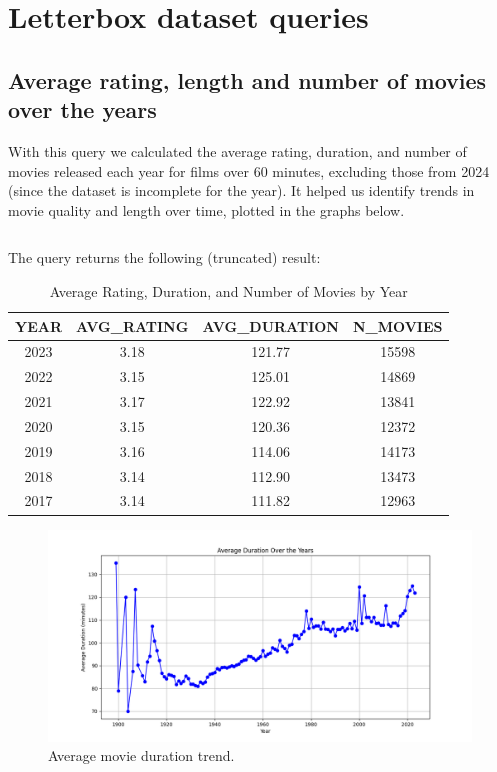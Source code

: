 \documentclass{Configuration_Files/PoliMi3i_thesis}
\begin{document}
\section{Letterbox dataset queries}

\subsection{Average rating, length and number of movies over the years}

With this query we calculated the average rating, duration, and number of movies released each year for films over 60 minutes, excluding those from 2024 (since the dataset is incomplete for the year). It helped us identify trends in movie quality and length over time, plotted in the graphs below.

\inputminted[frame=single,framesep=10pt,breaklines]{cypher}{letterboxd/queries/query1.cypher}

The query returns the following (truncated) result:

\begin{table}[h!]
\centering
\begin{tabular}{|c|c|c|c|}
\hline
\textbf{YEAR} & \textbf{AVG\_RATING} & \textbf{AVG\_DURATION} & \textbf{N\_MOVIES} \\ \hline
2023 & 3.18 & 121.77 & 15598 \\ \hline
2022 & 3.15 & 125.01 & 14869 \\ \hline
2021 & 3.17 & 122.92 & 13841 \\ \hline
2020 & 3.15 & 120.36 & 12372 \\ \hline
2019 & 3.16 & 114.06 & 14173 \\ \hline
2018 & 3.14 & 112.90 & 13473 \\ \hline
2017 & 3.14 & 111.82 & 12963 \\ \hline
\end{tabular}
\caption{Average Rating, Duration, and Number of Movies by Year}
\end{table}

\begin{figure}[!h]
  \centering
  \includegraphics[width=\textwidth]{Project Template/letterboxd/visualization/average_duration_trend.png}
  \caption{Average movie duration trend.}
  \label{fig:duration_trend}
\end{figure}
\end{document}
